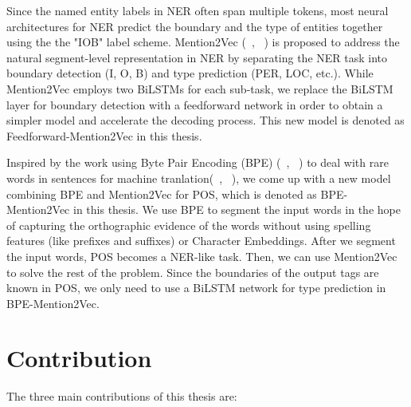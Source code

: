 \documentclass{sfuthesis}
\newcommand{\mb}{BPE-Mention2Vec}
\begin{document}
Since the named entity labels in NER often span multiple tokens, most neural architectures for NER predict the boundary and the type of entities together using the the "IOB" label scheme. Mention2Vec (~\citeauthor{stratos2016mention2vec}, ~\citeyear{stratos2016mention2vec}) is proposed to address the natural segment-level representation in NER by separating the NER task into boundary detection (I, O, B) and type prediction (PER, LOC, etc.). While Mention2Vec employs two BiLSTMs for each sub-task, we replace the BiLSTM layer for boundary detection with a feedforward network in order to obtain a simpler model and accelerate the decoding process. This new model is denoted as Feedforward-Mention2Vec in this thesis.

Inspired by the work using Byte Pair Encoding (BPE) (~\citeauthor{gage1994new}, ~\citeyear{gage1994new}) to deal with rare words in sentences for machine tranlation(~\citeauthor{sennrich2015neural}, ~\citeyear{sennrich2015neural}), we come up with a new model combining BPE and Mention2Vec for POS, which is denoted as BPE-Mention2Vec in this thesis. We use BPE to segment the input words in the hope of capturing the orthographic evidence of the words without using spelling features (like prefixes and suffixes) or Character Embeddings. After we segment the input words, POS becomes a NER-like task. Then, we can use Mention2Vec to solve the rest of the problem. Since the boundaries of the output tags are known in POS, we only need to use a BiLSTM network for type prediction in \mb.

\section{Contribution}
The three main contributions of this thesis are:
\end{document}
